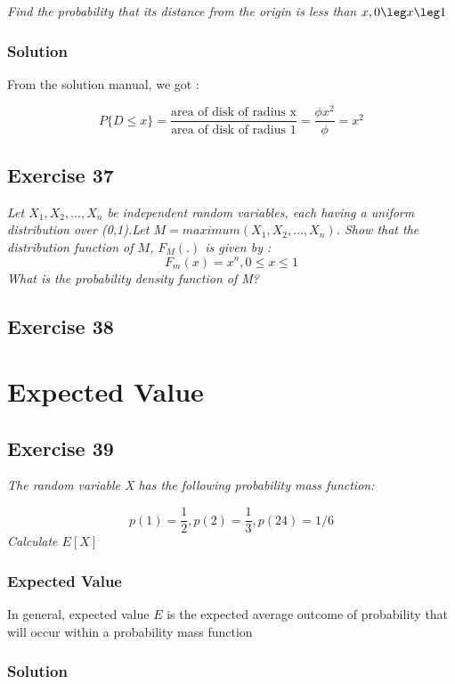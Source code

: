 \documentclass[12pt,a4paper]{article}
\begin{document}
\textit{Find the probability that its distance from the origin is less than $x, 0 \leg x \leg 1$}

\subsubsection{Solution}

From the solution manual, we got :

\[
    P\{D \leq x\} = \frac{\text{area of disk of radius x}}{\text{area of disk of radius 1}} = \frac{\phi{}x^2}{\phi} = x^2
\]

\subsection{Exercise 37}

\textit{Let $X_1, X_2, \dots, X_n$ be independent random variables, each having a uniform distribution over (0,1).Let $M = maximum(X_1, X_2, \dots, X_n)$. Show that the distribution function of $M$, $F_M(.)$ is given by : }
\[
        F_m(x) = x^n, 0 \leq x \leq 1
\]
\textit{What is the probability density function of M?}

\subsection{Exercise 38}

\section{Expected Value}

\subsection{Exercise 39}

\textit{The random variable X has the following probability mass function:}

\[
    p(1) = \frac{1}{2}, p(2) = \frac{1}{3}, p(24) = {1/6}
\]
\textit{Calculate $E[X]$}

\subsubsection{Expected Value}

In general, expected value $E$ is the expected average outcome of probability that will occur within a probability mass function


\subsubsection{Solution}
\end{document}
